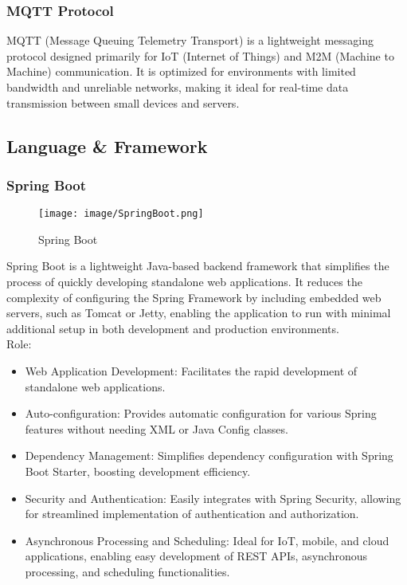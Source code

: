 \documentclass[conference]{IEEEtran}
\begin{document}
\subsubsection{MQTT Protocol}

\noindent MQTT (Message Queuing Telemetry Transport) is a lightweight messaging protocol designed primarily for IoT (Internet of Things) and M2M (Machine to Machine) communication. It is optimized for environments with limited bandwidth and unreliable networks, making it ideal for real-time data transmission between small devices and servers.\\

\subsection{Language \& Framework}

\subsubsection{Spring Boot}

\begin{figure}[h!]
    \centering
    \texttt{[image: image/SpringBoot.png]}
    \caption{Spring Boot}
    \label{fig:enter-label}
\end{figure}

\noindent Spring Boot is a lightweight Java-based backend framework that simplifies the process of quickly developing standalone web applications. It reduces the complexity of configuring the Spring Framework by including embedded web servers, such as Tomcat or Jetty, enabling the application to run with minimal additional setup in both development and production environments.\\

Role:
\begin{itemize}
\item Web Application Development: Facilitates the rapid development of standalone web applications.\\
\item Auto-configuration: Provides automatic configuration for various Spring features without needing XML or Java Config classes.\\
\item  Dependency Management: Simplifies dependency configuration with Spring Boot Starter, boosting development efficiency. \\
\item Security and Authentication: Easily integrates with Spring Security, allowing for streamlined implementation of authentication and authorization. \\
\item Asynchronous Processing and Scheduling: Ideal for IoT, mobile, and cloud applications, enabling easy development of REST APIs, asynchronous processing, and scheduling functionalities. \\
\end{itemize}
\end{document}
